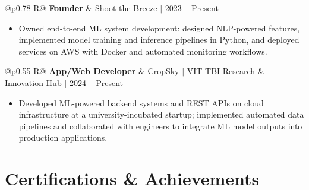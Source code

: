 \documentclass[a4paper,10pt]{article}
\newcommand{\ulink}[2]{\href{#1}{\uline{#2}}}
\newcommand{\subheading}[1]{{\color[HTML]{0A0A0A}\fontsize{12}{14}\selectfont\bfseries #1}}
\newcommand{\meta}[1]{{\color[HTML]{5C5C5C}\fontsize{10.5}{12.5}\selectfont #1}}
\begin{document}
\begin{tabularx}{\linewidth}{@{}p{0.78\linewidth} R@{}}
\subheading{Founder} & \meta{\ulink{https://shoot-the-breeze.vercel.app}{Shoot the Breeze} $|$ 2023 -- Present}
\end{tabularx}
\begin{itemize}[nosep, leftmargin=1.5em, itemsep=1pt, topsep=2pt]
\item {\color[HTML]{0A0A0A}\fontsize{11}{14}\selectfont
Owned end-to-end ML system development: designed NLP-powered features, implemented model training and inference pipelines in Python, and deployed services on AWS with Docker and automated monitoring workflows.}
\end{itemize}

\vspace{2pt}

\begin{tabularx}{\linewidth}{@{}p{0.55\linewidth} R@{}}
\subheading{App/Web Developer} & \meta{\ulink{https://sites.google.com/view/cropsky/home}{CropSky} $|$ VIT-TBI Research \& Innovation Hub $|$ 2024 -- Present}
\end{tabularx}
\begin{itemize}[nosep, leftmargin=1.5em, itemsep=1pt, topsep=2pt]
\item {\color[HTML]{0A0A0A}\fontsize{11}{14}\selectfont
Developed ML-powered backend systems and REST APIs on cloud infrastructure at a university-incubated startup; implemented automated data pipelines and collaborated with engineers to integrate ML model outputs into production applications.}
\end{itemize}

\vspace{2pt}

\section{Certifications \& Achievements}
\vspace{2pt}
\end{document}
